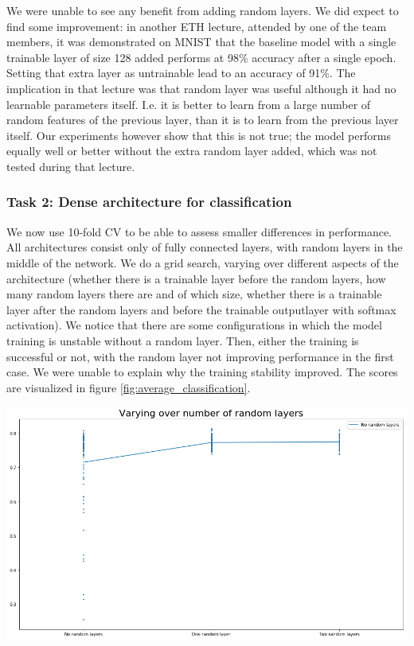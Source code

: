 \documentclass[]{article}
\newenvironment{Figure}
{\par\medskip\noindent\minipage{\linewidth}}
{\endminipage\par\medskip}
\begin{document}
\begin{multicols}{2}
	We were unable to see any benefit from adding random layers. We did expect to find some improvement: in another ETH lecture, attended by one of the team members, it was demonstrated on MNIST that the baseline model with a single trainable layer of size 128 added performs at 98\% accuracy after a single epoch. Setting that extra layer as untrainable lead to an accuracy of 91\%. The implication in that lecture was that random layer was useful although it had no learnable parameters itself. I.e. it is better to learn from a large number of random features of the previous layer, than it is to learn from the previous layer itself. Our experiments however show that this is not true; the model performs equally well or better without the extra random layer added, which was not tested during that lecture.
	
	\subsubsection*{Task 2: Dense architecture for classification}
	We now use 10-fold CV to be able to assess smaller differences in performance. All architectures consist only of fully connected layers, with random layers in the middle of the network. We do a grid search, varying over different aspects of the architecture (whether there is a trainable layer before the random layers, how many random layers there are and of which size, whether there is a trainable layer after the random layers and before the trainable outputlayer with softmax activation). We notice that there are some configurations in which the model training is unstable without a random layer. Then, either the training is successful or not, with the random layer not improving performance in the first case. We were unable to explain why the training stability improved. The scores are visualized in figure \ref{fig:average_classification}.
	
	\begin{Figure}
		\centering
		\includegraphics[width=\linewidth]{average_classification}
		\label{fig:average_classification}
	\end{Figure}
	

\end{multicols}
\end{document}
